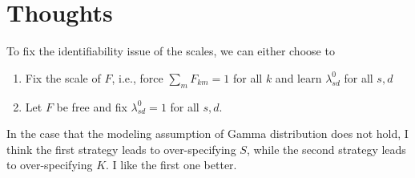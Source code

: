 \documentclass[11pt,twoside]{article}
\theoremstyle{plain}
\numberwithin{theorem}{section}
\numberwithin{proposition}{section}
\numberwithin{lemma}{section}
\numberwithin{definition}{section}
\numberwithin{condition}{section}
\numberwithin{problem}{section}
\numberwithin{corollary}{section}
\numberwithin{assumption}{section}
\numberwithin{example}{section}
\numberwithin{conjecture}{section}
\theoremstyle{definition}
\numberwithin{remark}{section}
\begin{document}
\section*{Thoughts}
To fix the identifiability issue of the scales, we can either choose to
\begin{enumerate}
    \item Fix the scale of $F$, i.e., force $\sum_m F_{km} = 1$ for all $k$ and learn $\lambda^{0}_{sd}$ for all $s, d$
    \item Let $F$ be free and fix $\lambda^{0}_{sd} = 1$ for all $s, d$. 
\end{enumerate}
In the case that the modeling assumption of Gamma distribution does not hold, I think the first strategy leads to over-specifying $S$, while the second strategy leads to over-specifying $K$. I like the first one better. 





\end{document}
